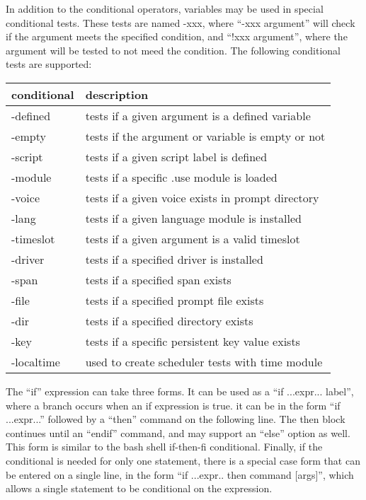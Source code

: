 \documentclass[a4paper,12pt]{article}
\begin{document}
In addition to the conditional operators, variables may be used in special 
conditional tests.  These tests are named -xxx, where ``-xxx argument'' 
will check if the argument meets the specified condition, and ``!xxx 
argument'', where the argument will be tested to not meed the condition.  
The following conditional tests are supported: \\

\begin{supertabular}{|l|l|}\hline
\textbf{conditional}      & \textbf{description} \\\hline
-defined        & tests if a given argument is a defined variable \\
-empty          & tests if the argument or variable is empty or not \\
-script         & tests if a given script label is defined \\
-module         & tests if a specific .use module is loaded \\
-voice          & tests if a given voice exists in prompt directory \\
-lang		& tests if a given language module is installed \\
-timeslot	& tests if a given argument is a valid timeslot \\
-driver		& tests if a specified driver is installed \\
-span		& tests if a specified span exists \\
-file		& tests if a specified prompt file exists \\
-dir		& tests if a specified directory exists \\
-key		& tests if a specific persistent key value exists \\
-localtime	& used to create scheduler tests with time module \\
\end{supertabular}

The ``if'' expression can take three forms.  It can be used as a ``if 
...expr... label'', where a branch occurs when an if expression is true. 
it can be in the form ``if ...expr...'' followed by a ``then'' command
on the following line.  The then block continues until an ``endif'' 
command, and may support an ``else'' option as well.  This form is similar 
to the bash shell if-then-fi conditional.  Finally, if the conditional is 
needed for only one statement, there is a special case form that can be 
entered on a single line, in the form ``if ...expr..  then command 
[args]'', which allows a single statement to be conditional on the 
expression. \\
\end{document}

